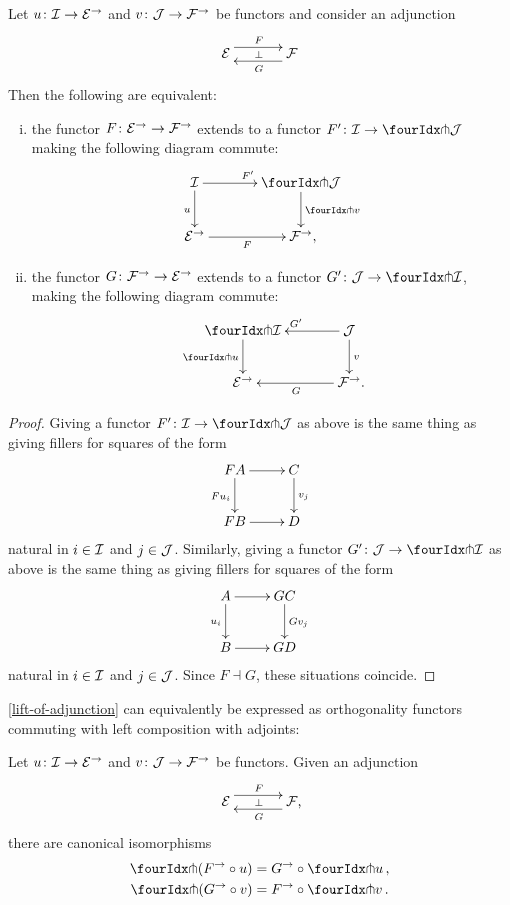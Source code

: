 \documentclass[reqno,10pt,a4paper,oneside,draft]{amsart}
\begin{document}
\begin{proposition} \label{lift-of-adjunction}
Let $u \co \cal{I} \to \cal{E}^\to$ and $v \co \cal{J} \to \cal{F}^\to$ be functors and consider an adjunction
\[
\xymatrix@C+1em{
  \cal{E}
  \ar@<5pt>[r]^{F}
  \ar@{}[r]|{\bot}
&
  \cal{F}
  \ar@<5pt>[l]^{G}
}
\]
Then the following are equivalent:
\begin{enumerate}[(i)]
\item the functor $F \co \cal{E}^\to \to \cal{F}^\to$ extends to a functor $F' \co \cal{I} \to \liftl{\cal{J}}$ making the following diagram commute:
\[
\xymatrix@C=1.2cm{
  \cal{I}
  \ar[r]^{F'}
  \ar[d]_{u}
&
  \liftl{\cal{J}}
  \ar[d]^{\liftl{v}}
\\
  \cal{E}^\to
  \ar[r]_-{F}
&
  \cal{F}^\to
\rlap{,}}
\]
\item the functor $G \co \cal{F}^\to \to \cal{E}^\to$ extends to a functor $G' \co \cal{J} \to \liftr{\cal{I}}$, making the following diagram commute:
\[
\xymatrix@C=1.2cm{
  \liftr{\cal{I}}
  \ar[d]_{\liftr{u}}
&
  \cal{J}
  \ar[l]_{G'}
  \ar[d]^{v}
\\
  \cal{E}^\to
&
  \cal{F}^\to
  \ar[l]^{G}
\rlap{.}}
\]
\end{enumerate}
\end{proposition}

\begin{proof}
Giving a functor $F' \co \cal{I} \to \liftl{\cal{J}}$ as above is the same thing as giving fillers for squares of the form
\[
\xymatrix{
  FA \ar[d]_{F u_i} \ar[r] & C \ar[d]^{v_j} \\
  FB \ar[r] & D
}
\]
natural in $i \in \cal{I}$ and $j \in \cal{J}$.
Similarly, giving a functor $G' \co \cal{J} \to \liftl{\cal{I}}$ as above is the same thing as giving fillers for squares of the form
\[
\xymatrix{
  A \ar[d]_{u_i} \ar[r] & GC \ar[d]^{Gv_j} \\
  B \ar[r] & GD
}
\]
natural in $i \in \cal{I}$ and $j \in \cal{J}$.
Since $F \dashv G$, these situations coincide.
\end{proof}

\cref{lift-of-adjunction} can equivalently be expressed as orthogonality functors commuting with left composition with adjoints:

\begin{corollary} \label{pitchfork-adjunction}
Let $u \co \cal{I} \to \cal{E}^\to$ and $v \co \cal{J} \to \cal{F}^\to$ be functors.
Given an adjunction
\[
\xymatrix@C+1em{
  \cal{E}
  \ar@<5pt>[r]^{F}
  \ar@{}[r]|{\bot}
&
  \cal{F}
  \ar@<5pt>[l]^{G}
\rlap{,}}
\]
 there are canonical isomorphisms
\begin{align*}
  \liftr{(F^\to \cc u)} &= G^\to \cc \liftr{u}
\, ,\\
  \liftl{(G^\to \cc v)} &= F^\to \cc \liftl{v}
\, .
\end{align*}
\end{corollary}
\end{document}
